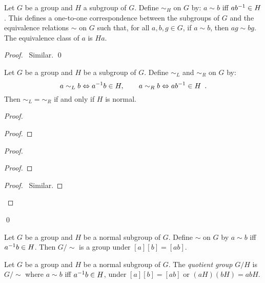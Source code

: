 \begin{prop}
Let $G$ be a group and $H$ a subgroup of $G$. Define $\sim_H$ on $G$ by: $a\sim b$ iff $a {b}^{-1} \in H$. This defines a one-to-one correspondence between the subgroups of $G$ and the equivalence relations $\sim$ on $G$ such that, for all $a,b,g \in G$, if $a \sim b$, then $ag \sim bg$. The equivalence class of $a$ is $Ha$.
\end{prop}

\begin{proof}
\pf\ Similar. \qed
\end{proof}

\begin{prop}
Let $G$ be a group and $H$ be a subgroup of $G$. Define $\sim_L$ and $\sim_R$ on $G$ by:
\[ a \sim_L b \Leftrightarrow {a}^{-1} b \in H, \qquad a \sim_R b \Leftrightarrow a {b}^{-1} \in H \enspace . \]
Then $\sim_L = \sim_R$ if and only if $H$ is normal.
\end{prop}

\begin{proof}
\pf
{}
\begin{proof}
\end{proof}
\begin{proof}
	\begin{proof}
	\end{proof}
	\begin{proof}
		\pf\ Similar.
	\end{proof}
\end{proof}
\qed
\end{proof}

\begin{cor}
Let $G$ be a group and $H$ be a normal subgroup of $G$. Define $\sim$ on $G$ by $a \sim b$ iff ${a}^{-1} b \in H$. Then $G / \sim$ is a group under $[a][b] = [ab]$.
\end{cor}

\begin{df}
Let $G$ be a group and $H$ be a normal subgroup of $G$. The \emph{quotient group} $G / H$ is $G / \sim$ where $a \sim b$ iff ${a}^{-1} b \in H$, under $[a][b] = [ab]$ or $(aH)(bH) = abH$.
\end{df}

